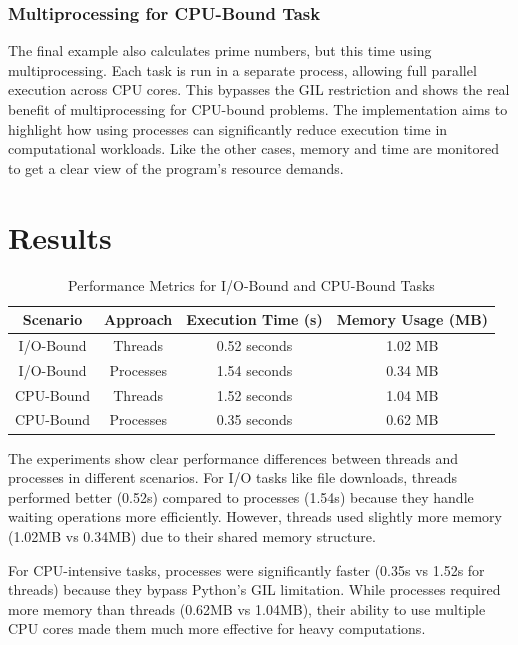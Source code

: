 \documentclass[onecolumn]{article}
\begin{document}
\subsubsection{Multiprocessing for CPU-Bound Task}
The final example also calculates prime numbers, but this time using multiprocessing. Each task is run in a separate process, allowing full parallel execution across CPU cores. This bypasses the GIL restriction and shows the real benefit of multiprocessing for CPU-bound problems. The implementation aims to highlight how using processes can significantly reduce execution time in computational workloads. Like the other cases, memory and time are monitored to get a clear view of the program’s resource demands. 


 

\section{Results}


\begin{table}[h!]
\centering

\begin{tabular}{|c|c|c|c|}
\hline
Scenario & Approach & Execution Time (s) & Memory Usage (MB)\\
\hline
I/O-Bound & Threads & 0.52 seconds& 1.02 MB\\
I/O-Bound & Processes & 1.54 seconds& 0.34 MB\\
CPU-Bound & Threads & 1.52 seconds& 1.04 MB\\
CPU-Bound & Processes & 0.35 seconds& 0.62 MB\\
\hline
\end{tabular}
\caption{Performance Metrics for I/O-Bound and CPU-Bound Tasks}
\end{table}

The experiments show clear performance differences between threads and processes in different scenarios. For I/O tasks like file downloads, threads performed better (0.52s) compared to processes (1.54s) because they handle waiting operations more efficiently. However, threads used slightly more memory (1.02MB vs 0.34MB) due to their shared memory structure.

For CPU-intensive tasks, processes were significantly faster (0.35s vs 1.52s for threads) because they bypass Python's GIL limitation. While processes required more memory than threads (0.62MB vs 1.04MB), their ability to use multiple CPU cores made them much more effective for heavy computations.
\end{document}
